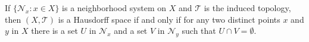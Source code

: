 If $\{\mathcal{N}_x : x \in X\}$ is a neighborhood system on $X$ and $\mathcal{T}$ is the induced topology, then $(X, \mathcal{T})$ is a Hausdorff space if and only if for any two distinct points $x$ and $y$ in $X$ there is a set $U$ in $\mathcal{N}_x$ and a set $V$ in $\mathcal{N}_y$ such that $U \cap V = \emptyset$.

